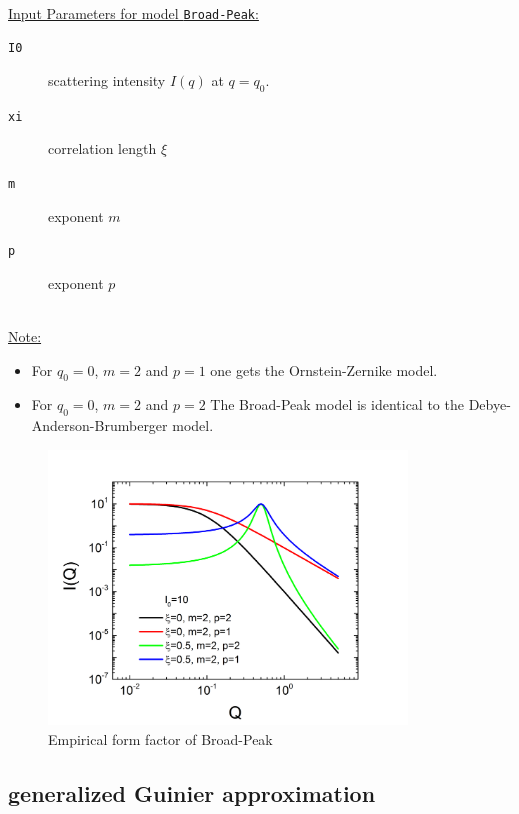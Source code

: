 \hspace{1pt}\\
\underline{Input Parameters for model \texttt{Broad-Peak}:}\\
\begin{description}
\item[\texttt{I0}] scattering intensity $I(q)$ at $q=q_0$.
\item[\texttt{xi}] correlation length $\xi$
\item[\texttt{m}] exponent $m$
\item[\texttt{p}] exponent $p$
\end{description}

\hspace{1pt}\\
\underline{Note:}
\begin{itemize}
\item For $q_0=0$, $m=2$ and $p=1$ one gets the Ornstein-Zernike model.
\item For $q_0=0$, $m=2$ and $p=2$ The Broad-Peak model is identical to the Debye-Anderson-Brumberger model.
\end{itemize}

\begin{figure}[htb]
\begin{center}
\includegraphics[width=0.85\textwidth]{BroadPeak.png}
\end{center}
\caption{Empirical form factor of Broad-Peak} \label{fig:BroadPeakIq}
\end{figure}

\clearpage
\subsection{generalized Guinier approximation \cite{Fratzl1994,Hjelm1992,Hjelm1995,Hjelm2000}}
\label{sec:generalizedGuinier}  ~\\

